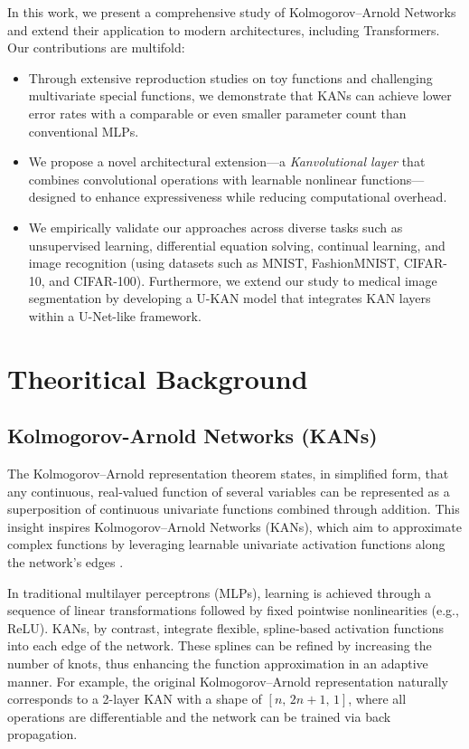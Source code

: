 \documentclass[conference]{IEEEtran}
\begin{document}
In this work, we present a comprehensive study of Kolmogorov–Arnold Networks
and extend their application to modern architectures, including Transformers.
Our contributions are multifold:
\begin{itemize}
    \item Through extensive reproduction studies on toy functions and challenging
          multivariate special functions, we demonstrate that KANs can achieve lower
          error rates with a comparable or even smaller parameter count than conventional
          MLPs.
    \item We propose a novel architectural extension—a \emph{Kanvolutional layer} that
          combines convolutional operations with learnable nonlinear functions—designed
          to enhance expressiveness while reducing computational overhead.
    \item We empirically validate our approaches across diverse tasks such as
          unsupervised learning, differential equation solving, continual learning, and
          image recognition (using datasets such as MNIST, FashionMNIST, CIFAR-10, and
          CIFAR-100). Furthermore, we extend our study to medical image segmentation by
          developing a U-KAN model that integrates KAN layers within a U-Net-like
          framework.
\end{itemize}

\section{Theoritical Background}\label{sec:theor_bg}

\subsection{Kolmogorov-Arnold Networks (KANs)}

The Kolmogorov–Arnold representation theorem states, in simplified form, that
any continuous, real‐valued function of several variables can be represented as
a superposition of continuous univariate functions combined through addition.
This insight inspires Kolmogorov–Arnold Networks (KANs), which aim to
approximate complex functions by leveraging learnable univariate activation
functions along the network’s edges \cite{kans}.

In traditional multilayer perceptrons (MLPs), learning is achieved through a
sequence of linear transformations followed by fixed pointwise nonlinearities
(e.g., ReLU). KANs, by contrast, integrate flexible, spline‐based activation
functions into each edge of the network. These splines can be refined by
increasing the number of knots, thus enhancing the function approximation in an
adaptive manner. For example, the original Kolmogorov–Arnold representation
naturally corresponds to a 2-layer KAN with a shape of \([n,\,2n+1,\,1]\),
where all operations are differentiable and the network can be trained via back
propagation.
\end{document}
